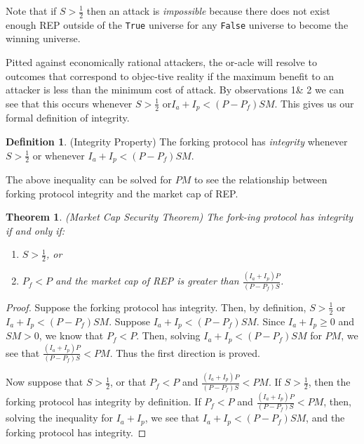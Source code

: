 \documentclass[12pt,floatfix,reprint,nofootinbib,amsmath,amssymb,epsfig,pre,floats,letterpaper,groupedaffiliation]{revtex4-1}
\newtheorem{theorem}{Theorem}
\theoremstyle{definition}
\theoremstyle{definition}
\newtheorem{definition}{Definition}
\begin{document}
Note that if $S > \frac{1}{2}$ then an attack is \textit{impossible} because there does not exist enough REP outside of the \texttt{True} universe for any \texttt{False} universe to become the winning universe.

Pitted against economically rational attackers, the or-\linebreak acle will resolve to outcomes that correspond to objec-\linebreak tive reality if the maximum benefit to an attacker is less than the minimum cost of attack. By observations 1\linebreak \& 2 we can see that this occurs whenever $S > \frac{1}{2}$ or\linebreak $I_a + I_p < (P - P_f)SM$. This gives us our formal def\-inition of integrity.

\begin{definition}\label{ob:integrity_property}
(Integrity Property) The forking protocol has \textit{integrity} whenever $S > \frac{1}{2}$ or whenever $I_a + I_p < (P - P_f)SM$.
\end{definition}

The above inequality can be solved for $PM$ to see the relationship between forking protocol integrity and the market cap of REP.

\begin{theorem}\label{th:market_cap_security_theorem}
(Market Cap Security Theorem) The fork-\linebreak ing protocol has integrity if and only if:
\begin{enumerate}
\item $S > \frac{1}{2}$, or
\item $P_f < P$ and the market cap of REP is greater than $\frac{(I_a + I_p)P}{(P - P_f)S}$.
\end{enumerate}
\end{theorem}

\begin{proof}
Suppose the forking protocol has integrity. Then, by definition, $S > \frac{1}{2}$ or $I_a + I_p < (P - P_f)SM$. Suppose $I_a + I_p < (P - P_f)SM$. Since $I_a + I_p \geq 0$ and $SM > 0$, we know that $P_f < P$. Then, solving $I_a + I_p < (P - P_f)SM$ for $PM$, we see that $\frac{(I_a + I_p)P}{(P - P_f)S} < PM$. Thus the first direction is proved.

Now suppose that $S > \frac{1}{2}$, or that $P_f < P$ and $\frac{(I_a + I_p)P}{(P - P_f)S} < PM$. If $S > \frac{1}{2}$, then the forking protocol has integrity by definition. If $P_f < P$ and $\frac{(I_a + I_p)P}{(P - P_f)S} < PM$, then, solving the inequality for $I_a + I_p$, we see that $I_a + I_p < (P-P_f) SM$, and the forking protocol has integrity.
\end{proof}
\end{document}
